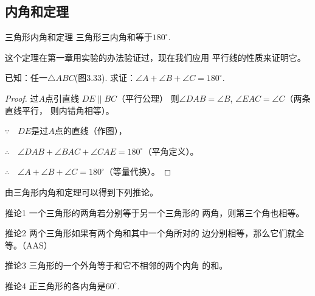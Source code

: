 \subsection{内角和定理}

\begin{blk}
  {三角形内角和定理} 三角形三内角和等于$180^{\circ}$.  
\end{blk}

这个定理在第一章用实验的办法验证过，现在我们应用
平行线的性质来证明它。

已知：任一$\triangle ABC$(图3.33). 求证：$\angle A+\angle B+
\angle C=180^{\circ}$.

\begin{figure}[htp]
    \centering
{}
    \caption{}
\end{figure}

\begin{proof}
    过$A$点引直线
$DE\parallel BC$（平行公理）
则$\angle DAB=\angle B$, $\angle EAC=\angle C$（两条直线平行，
则内错角相等）。

$\because\quad DE$是过$A$点的直线（作图），

$\therefore\quad \angle DAB+\angle BAC+\angle CAE=180^{\circ}$（平角定义）。

$\therefore\quad \angle A+\angle B+\angle C=180^{\circ}$（等量代换）。
\end{proof}

由三角形内角和定理可以得到下列推论。

\begin{blk}
    {推论1} 一个三角形的两角若分别等于另一个三角形的
两角，则第三个角也相等。
\end{blk}


\begin{blk}
    {推论2} 两个三角形如果有两个角和其中一个角所对的
边分别相等，那么它们就全等。（AAS）
\end{blk}


\begin{blk}
    {推论3} 三角形的一个外角等于和它不相邻的两个内角
的和。
\end{blk}

\begin{blk}
    {推论4} 正三角形的各内角是$60^{\circ}$.
\end{blk}

